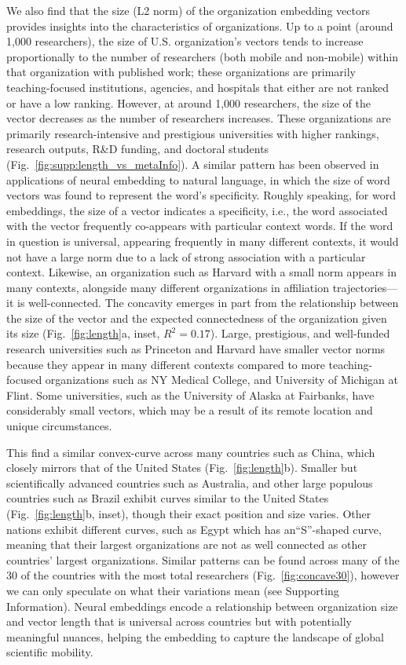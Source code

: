 \documentclass[12pt]{article} %
\def\SI{Supporting Information}
\begin{document}
We also find that the size (L2 norm) of the organization embedding vectors provides insights into the characteristics of organizations.
Up to a point (around 1,000 researchers), the size of U.S. organization's vectors tends to increase proportionally to the number of researchers (both mobile and non-mobile) within that organization with published work;
these organizations are primarily teaching-focused institutions, agencies, and hospitals that either are not ranked or have a low ranking.
However, at around 1,000 researchers, the size of the vector decreases as the number of researchers increases.
These organizations are primarily research-intensive and prestigious universities with higher rankings, research outputs, R\&D funding, and doctoral students (Fig.~\ref{fig:supp:length_vs_metaInfo}).
A similar pattern has been observed in applications of neural embedding to natural language, in which the size of word vectors was found to represent the word's specificity.
Roughly speaking, for word embeddings, the size of a vector indicates a specificity, i.e., the word associated with the vector frequently co-appears with particular context words\autocite{schakel2015measuring}. 
If the word in question is universal, appearing frequently in many different contexts, it would not have a large norm due to a lack of strong association with a particular context.
Likewise, an organization such as Harvard with a small norm appears in many contexts, alongside many different organizations in affiliation trajectories---it is well-connected.
The concavity emerges in part from the relationship between the size of the vector and the expected connectedness of the organization given its size (Fig.~\ref{fig:length}a, inset, $R^{2} = 0.17$).
Large, prestigious, and well-funded research universities such as Princeton and Harvard have smaller vector norms because they appear in many different contexts compared to more teaching-focused organizations such as NY Medical College, and University of Michigan at Flint.
Some universities, such as the University of Alaska at Fairbanks, have considerably small vectors, which may be a result of its remote location and unique circumstances.


This find a similar convex-curve across many countries such as China, which closely mirrors that of the United States (Fig.~\ref{fig:length}b).
Smaller but scientifically advanced countries such as Australia, and other large populous countries such as Brazil exhibit curves similar to the United States (Fig.~\ref{fig:length}b, inset), though their exact position and size varies.
Other nations exhibit different curves, such as Egypt which has an``S''-shaped curve, meaning that their largest organizations are not as well connected as other countries' largest organizations. 
Similar patterns can be found across many of the 30 of the countries with the most total researchers (Fig.~\ref{fig:concave30}), however we can only speculate on what their variations mean (see \SI).
Neural embeddings encode a relationship between organization size and vector length that is universal across countries but with potentially meaningful nuances, helping the embedding to capture the landscape of global scientific mobility. 
\end{document}
